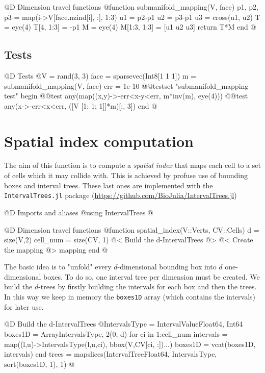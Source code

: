 @D Dimension travel functions
@{function submanifold_mapping(V, face)
    p1, p2, p3 = map(i->V[face.nzind[i], :], 1:3)
    u1 = p2-p1
    u2 = p3-p1
    u3 = cross(u1, u2)
    T = eye(4)
    T[4, 1:3] = -p1
    M = eye(4)
    M[1:3, 1:3] = [u1 u2 u3]
    return T*M
end
@}
\subsection{Tests}

@D Tests
@{V = rand(3, 3)
face = sparsevec(Int8[1 1 1])
m = submanifold_mapping(V, face)
err = 1e-10 
@@testset "submanifold_mapping test" begin
    @@test any(map((x,y)->-err<x-y<err, m*inv(m), eye(4)))
    @@test any(x->-err<x<err, ([V [1; 1; 1]]*m)[:, 3])
end
@}





\section{Spatial index computation}

The aim of this function is to compute a \textit{spatial index} that maps
each cell to a set of cells which it may collide with.
This is achieved by profuse use of bounding boxes and interval trees. 
These last ones are implemented with the \texttt{IntervalTrees.jl} package
(\url{https://github.com/BioJulia/IntervalTrees.jl})

@D Imports and aliases
@{using IntervalTrees
@}

@D Dimension travel functions
@{function spatial_index(V::Verts, CV::Cells)
    d = size(V,2)
    cell_num = size(CV, 1)
    @< Build the d-IntervalTrees @>
    @< Create the mapping @>
    mapping
end
@}

The basic idea is to "unfold" every $d$-dimensional bounding box into $d$ one-dimensional boxes.
To do so, one interval tree per dimension must be created. 
We build the $d$-trees by firstly building the intervals for each box and then the trees.
In this way we keep in memory the \texttt{boxes1D} array (which contains the intervals) for later use.

@D Build the d-IntervalTrees
@{IntervalsType = IntervalValue{Float64, Int64}
boxes1D = Array{IntervalsType, 2}(0, d)
for ci in 1:cell_num
    intervals = map((l,u)->IntervalsType(l,u,ci), bbox(V,CV[ci, :])...)
    boxes1D = vcat(boxes1D, intervals)
end
trees = mapslices(IntervalTree{Float64, IntervalsType}, sort(boxes1D, 1), 1)
@}

